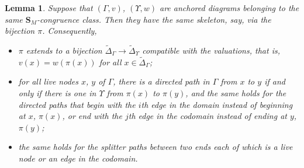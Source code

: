 \documentclass[12pt]{amsart}
\theoremstyle{plain}
\newtheorem{lem}[thm]{Lemma}
\theoremstyle{definition}
\theoremstyle{remark}
\numberwithin{equation}{section}
\theoremstyle{plain}
\newcommand{\0}{\emptyset}
\newcommand{\fun}{\longrightarrow}
\begin{document}
\begin{lem}\label{decor:mat}
Suppose that $(\Gamma, v)$, $(\Upsilon, w)$ are anchored diagrams belonging to the same $\bm S_M$-congruence class. Then they have the same skeleton, say, via the bijection $\pi$. Consequently,
\begin{itemize}
 \item $\pi$ extends to a bijection $\tilde \Delta_\Gamma \fun \tilde \Delta_{\Upsilon}$ compatible with the valuations, that is, $v(x) = w(\pi(x))$ for all $x \in \tilde \Delta_\Gamma$;
 \item for all live nodes $x$, $y$ of $\Gamma$, there is a directed path in $\Gamma$ from $x$ to $y$ if and only if there is one in $\Upsilon$ from $\pi(x)$ to $\pi(y)$, and the same holds for the directed paths that begin with the $i$th edge in the domain instead of beginning at $x$, $\pi(x)$, or end with the $j$th edge in the codomain instead of ending at $y$, $\pi(y)$;
 \item the same holds for the splitter paths between two ends each of which is a live node or an edge in the codomain.
\end{itemize}
\end{lem}
\end{document}
